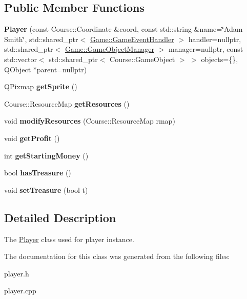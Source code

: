 \subsection*{Public Member Functions}
\begin{DoxyCompactItemize}
\item 
\hypertarget{class_game_1_1_player_a1c6a5ecfdb2bc7585a9bb0ad63d5e295}{{\bfseries Player} (const Course\-::\-Coordinate \&coord, const std\-::string \&name=\char`\"{}Adam Smith\char`\"{}, std\-::shared\-\_\-ptr$<$ \hyperlink{class_game_1_1_game_event_handler}{Game\-::\-Game\-Event\-Handler} $>$ handler=nullptr, std\-::shared\-\_\-ptr$<$ \hyperlink{class_game_1_1_game_object_manager}{Game\-::\-Game\-Object\-Manager} $>$ manager=nullptr, const std\-::vector$<$ std\-::shared\-\_\-ptr$<$ Course\-::\-Game\-Object $>$ $>$ objects=\{\}, Q\-Object $\ast$parent=nullptr)}\label{class_game_1_1_player_a1c6a5ecfdb2bc7585a9bb0ad63d5e295}

\item 
\hypertarget{class_game_1_1_player_a0cf49c79fa3670f60ca21137a3085305}{Q\-Pixmap {\bfseries get\-Sprite} ()}\label{class_game_1_1_player_a0cf49c79fa3670f60ca21137a3085305}

\item 
\hypertarget{class_game_1_1_player_a10a40ea56561cbc1532bc448d6459bd7}{Course\-::\-Resource\-Map {\bfseries get\-Resources} ()}\label{class_game_1_1_player_a10a40ea56561cbc1532bc448d6459bd7}

\item 
\hypertarget{class_game_1_1_player_aaba8eb44f579f90c6c07cfe6008e1072}{void {\bfseries modify\-Resources} (Course\-::\-Resource\-Map rmap)}\label{class_game_1_1_player_aaba8eb44f579f90c6c07cfe6008e1072}

\item 
\hypertarget{class_game_1_1_player_ab7f45f2cabc308ab486b9efe296375eb}{void {\bfseries get\-Profit} ()}\label{class_game_1_1_player_ab7f45f2cabc308ab486b9efe296375eb}

\item 
\hypertarget{class_game_1_1_player_ab94597abfe513cb074ee4cb55e96dc0e}{int {\bfseries get\-Starting\-Money} ()}\label{class_game_1_1_player_ab94597abfe513cb074ee4cb55e96dc0e}

\item 
\hypertarget{class_game_1_1_player_a7b5b255cd9f1e8887efdf1f8bdc5e128}{bool {\bfseries has\-Treasure} ()}\label{class_game_1_1_player_a7b5b255cd9f1e8887efdf1f8bdc5e128}

\item 
\hypertarget{class_game_1_1_player_ad6313f98158cdd6d4d5a20b1c21a397a}{void {\bfseries set\-Treasure} (bool t)}\label{class_game_1_1_player_ad6313f98158cdd6d4d5a20b1c21a397a}

\end{DoxyCompactItemize}


\subsection{Detailed Description}
The \hyperlink{class_game_1_1_player}{Player} class used for player instance. 

The documentation for this class was generated from the following files\-:\begin{DoxyCompactItemize}
\item 
player.\-h\item 
player.\-cpp\end{DoxyCompactItemize}
